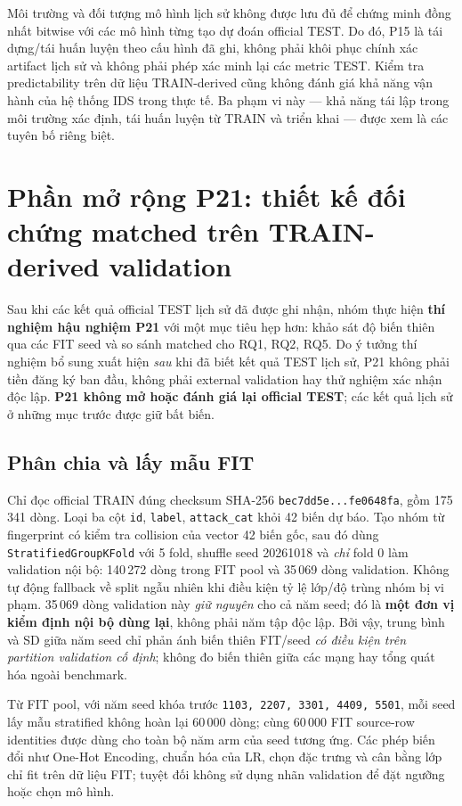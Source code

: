 Môi trường và đối tượng mô hình lịch sử không được lưu đủ để chứng minh đồng nhất bitwise với các mô hình từng tạo dự đoán official TEST. Do đó, P15 là tái dựng/tái huấn luyện theo cấu hình đã ghi, không phải khôi phục chính xác artifact lịch sử và không phải phép xác minh lại các metric TEST. Kiểm tra predictability trên dữ liệu TRAIN-derived cũng không đánh giá khả năng vận hành của hệ thống IDS trong thực tế. Ba phạm vi này — khả năng tái lập trong môi trường xác định, tái huấn luyện từ TRAIN và triển khai — được xem là các tuyên bố riêng biệt.


\section{Phần mở rộng P21: thiết kế đối chứng matched trên TRAIN-derived validation}
\label{sec:p21-method}
Sau khi các kết quả official TEST lịch sử đã được ghi nhận, nhóm thực hiện \textbf{thí nghiệm hậu nghiệm P21} với một mục tiêu hẹp hơn: khảo sát độ biến thiên qua các FIT seed và so sánh matched cho RQ1, RQ2, RQ5. Do ý tưởng thí nghiệm bổ sung xuất hiện \emph{sau} khi đã biết kết quả TEST lịch sử, P21 không phải tiền đăng ký ban đầu, không phải external validation hay thử nghiệm xác nhận độc lập. \textbf{P21 không mở hoặc đánh giá lại official TEST}; các kết quả lịch sử ở những mục trước được giữ bất biến.

\subsection{Phân chia và lấy mẫu FIT}
Chỉ đọc official TRAIN đúng checksum SHA-256 \texttt{bec7dd5e...fe0648fa}, gồm 175\,341 dòng. Loại ba cột \texttt{id}, \texttt{label}, \texttt{attack\_cat} khỏi 42 biến dự báo. Tạo nhóm từ fingerprint có kiểm tra collision của vector 42 biến gốc, sau đó dùng \texttt{StratifiedGroupKFold} với 5 fold, shuffle seed 20261018 và \emph{chỉ} fold 0 làm validation nội bộ: 140\,272 dòng trong FIT pool và 35\,069 dòng validation. Không tự động fallback về split ngẫu nhiên khi điều kiện tỷ lệ lớp/độ trùng nhóm bị vi phạm. 35\,069 dòng validation này \emph{giữ nguyên} cho cả năm seed; đó là \textbf{một đơn vị kiểm định nội bộ dùng lại}, không phải năm tập độc lập. Bởi vậy, trung bình và SD giữa năm seed chỉ phản ánh biến thiên FIT/seed \emph{có điều kiện trên partition validation cố định}; không đo biến thiên giữa các mạng hay tổng quát hóa ngoài benchmark.

Từ FIT pool, với năm seed khóa trước \texttt{1103, 2207, 3301, 4409, 5501}, mỗi seed lấy mẫu stratified không hoàn lại 60\,000 dòng; cùng 60\,000 FIT source-row identities được dùng cho toàn bộ năm arm của seed tương ứng. Các phép biến đổi như One-Hot Encoding, chuẩn hóa của LR, chọn đặc trưng và cân bằng lớp chỉ fit trên dữ liệu FIT; tuyệt đối không sử dụng nhãn validation để đặt ngưỡng hoặc chọn mô hình.

